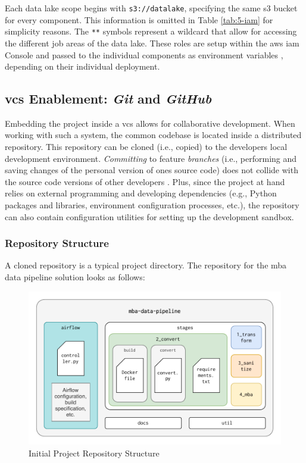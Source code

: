 Each data lake scope begins with \texttt{s3://datalake}, specifying the same \ac{s3} bucket for every component. This information is omitted in Table \ref{tab:5-iam} for simplicity reasons. The \texttt{**} symbols represent a wildcard that allow for accessing the different job areas of the data lake. These roles are setup within the \ac{aws} \ac{iam} Console and passed to the individual components as environment variables \cite{iam}, depending on their individual deployment. 

\subsection{\acs{vcs} Enablement: \textit{Git} and \textit{GitHub}}
Embedding the project inside a \ac{vcs} allows for collaborative development. When working with such a system, the common codebase is located inside a distributed repository. This repository can be cloned (i.e., copied) to the developers local development environment. \textit{Committing} to feature \textit{branches} (i.e., performing and saving changes of the personal version of ones source code) does not collide with the source code versions of other developers \cite[9\psqq]{Chacon2020}. Plus, since the project at hand relies on external programming and developing dependencies (e.g., Python packages and libraries, environment configuration processes, etc.), the repository can also contain configuration utilities for setting up the development sandbox.

\subsubsection{Repository Structure}
A cloned repository is a typical project directory. The repository for the \ac{mba} data pipeline solution looks as follows:
\newpage
\begin{figure}[h!]
	\centering
	\includegraphics[width=\linewidth]{main-matter/img/5-repo-structure.pdf}
	\caption{Initial Project Repository Structure}
	\label{fig:5-repo-structure}
\end{figure}

